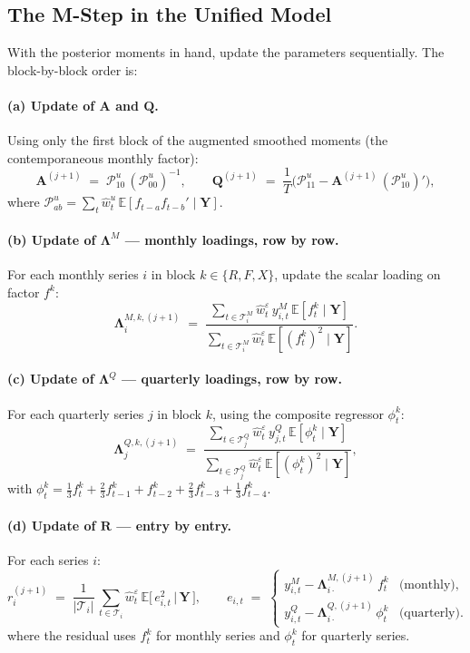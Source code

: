 \documentclass[11pt, a4paper, oneside]{article}
\newcommand{\mL}{\boldsymbol{\Lambda}}
\begin{document}
\subsection{The M-Step in the Unified Model}
\label{subsec:full-m-step}

With the posterior moments in hand, update the parameters
sequentially. The block-by-block order is:

\paragraph{(a) Update of $\mathbf{A}$ and $\mathbf{Q}$.}
Using only the first block of the augmented smoothed moments (the
contemporaneous monthly factor):
\begin{equation*}
\mathbf{A}^{(j+1)} \;=\; \mathcal{P}_{10}^{u}\, (\mathcal{P}_{00}^{u})^{-1},
\qquad
\mathbf{Q}^{(j+1)} \;=\; \frac{1}{T}\Big(\mathcal{P}_{11}^{u} - \mathbf{A}^{(j+1)}\, (\mathcal{P}_{10}^{u})'\Big),
\end{equation*}
where $\mathcal{P}_{ab}^{u} = \sum_t \hat{w}^u_t\, \mathbb{E}[f_{t-a} f_{t-b}' \mid \mathbf{Y}]$.

\paragraph{(b) Update of $\mL^M$ — monthly loadings, row by row.}
For each monthly series $i$ in block $k \in \{R, F, X\}$, update the
scalar loading on factor $f^k$:
\[
\mL^{M,k,(j+1)}_i \;=\;
\frac{\sum_{t \in \mathcal{T}^M_i} \hat{w}^\varepsilon_t\, y^M_{i,t}\, \mathbb{E}[f^k_t \mid \mathbf{Y}]}{\sum_{t \in \mathcal{T}^M_i} \hat{w}^\varepsilon_t\, \mathbb{E}[(f^k_t)^2 \mid \mathbf{Y}]}.
\]

\paragraph{(c) Update of $\mL^Q$ — quarterly loadings, row by row.}
For each quarterly series $j$ in block $k$, using the composite
regressor $\phi^k_t$:
\[
\mL^{Q,k,(j+1)}_j \;=\;
\frac{\sum_{t \in \mathcal{T}^Q_j} \hat{w}^\varepsilon_t\, y^Q_{j,t}\, \mathbb{E}[\phi^k_t \mid \mathbf{Y}]}{\sum_{t \in \mathcal{T}^Q_j} \hat{w}^\varepsilon_t\, \mathbb{E}[(\phi^k_t)^2 \mid \mathbf{Y}]},
\]
with $\phi^k_t = \tfrac{1}{3}f^k_t + \tfrac{2}{3}f^k_{t-1} + f^k_{t-2} + \tfrac{2}{3}f^k_{t-3} + \tfrac{1}{3}f^k_{t-4}$.

\paragraph{(d) Update of $\mathbf{R}$ — entry by entry.}
For each series $i$:
\[
r^{(j+1)}_i \;=\; \frac{1}{|\mathcal{T}_i|}\, \sum_{t \in \mathcal{T}_i} \hat{w}^\varepsilon_t\, \mathbb{E}\!\big[\,e_{i,t}^2 \,\big|\, \mathbf{Y}\,\big],
\qquad
e_{i,t} \;=\; \begin{cases}
y^M_{i,t} - \mL^{M,(j+1)}_{i\cdot}\, f^{k}_t & \text{(monthly)}, \\
y^Q_{i,t} - \mL^{Q,(j+1)}_{i\cdot}\, \phi^k_t & \text{(quarterly)}.
\end{cases}
\]
where the residual uses $f^k_t$ for monthly series and $\phi^k_t$ for
quarterly series.
\end{document}
